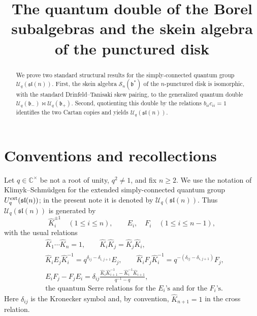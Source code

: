 \documentclass[11pt]{article}
\title{The quantum double of the Borel subalgebras and the skein algebra of the punctured disk}
\author{}
\date{}
\newcommand{\Uc}{\mathcal U}
\newcommand{\bcS}{\mathcal S}
\newcommand{\fb}{\mathfrak b}
\newcommand{\sl}{\mathfrak{sl}}
\newcommand{\bipr}{\bowtie}
\newcommand{\C}{\mathbb C}
\theoremstyle{definition}
\theoremstyle{remark}
\begin{document}
\maketitle

\begin{abstract}
We prove two standard structural results for the simply-connected quantum group
\(\Uc_q(\sl(n))\).  First, the skein algebra \(\bcS_n(\fb^*)\) of the
\(n\)-punctured disk is isomorphic, with the standard Drinfeld--Tanisaki skew
pairing, to the generalized quantum double
\(\Uc_q(\fb_-)\bipr \Uc_q(\fb_+)\).  Second, quotienting this double by the
relations \(b_{ii}c_{ii}=1\) identifies the two Cartan copies and yields
\(\Uc_q(\sl(n))\).
\end{abstract}

\section{Conventions and recollections}

Let \(q\in \C^\times\) be not a root of unity, \(q^2\neq 1\), and fix
\(n\ge 2\).  We use the notation of Klimyk--Schm\"udgen for the extended
simply-connected quantum group \(U_q^{\rm ext}(\sl(n))\); in the present note
it is denoted by \(\Uc_q(\sl(n))\).  Thus \(\Uc_q(\sl(n))\) is generated by
\[
\hat K_i^{\pm1}\quad (1\le i\le n),\qquad E_i,\quad F_i\quad (1\le i\le n-1),
\]
with the usual relations
\begin{equation}\label{eq:Uq-rels}
\begin{aligned}
&\hat K_1\cdots \hat K_n=1,\qquad
 \hat K_i\hat K_j=\hat K_j\hat K_i,\\
&\hat K_i E_j \hat K_i^{-1}=q^{\delta_{ij}-\delta_{i,j+1}}E_j,\qquad
 \hat K_i F_j \hat K_i^{-1}=q^{-(\delta_{ij}-\delta_{i,j+1})}F_j,\\
&E_iF_j-F_jE_i=\delta_{ij}\frac{\hat K_i\hat K_{i+1}^{-1}
       -\hat K_i^{-1}\hat K_{i+1}}{q^{-1}-q},\\
&\text{the quantum Serre relations for the \(E_i\)'s and for the \(F_i\)'s.}
\end{aligned}
\end{equation}
Here \(\delta_{ij}\) is the Kronecker symbol and, by convention,
\(\hat K_{n+1}=1\) in the cross relation.
\end{document}
